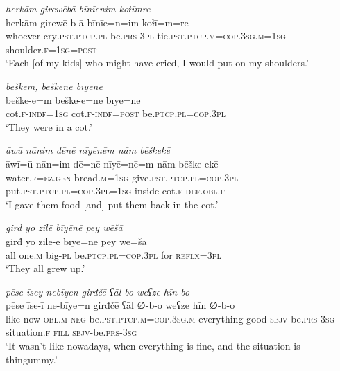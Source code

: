 \ea \label{ŽE.64}
\textit{herkām girewēbā bīnīenim koɫīmre} \\ 
\gll herkām girewē b-ā bīnīe=n=im koɫī=m=re \\ 
 whoever cry\textsc{.pst}\textsc{.ptcp}\textsc{.pl} be\textsc{.prs}\textsc{-3pl} tie\textsc{.pst}\textsc{.ptcp}\textsc{.m}\textsc{=cop}\textsc{.3sg}\textsc{.m}\textsc{=\textsc{1sg}} shoulder\textsc{.f}\textsc{=\textsc{1sg}}\textsc{=\textsc{post}} \\ 
\glt `Each [of my kids] who might have cried, I would put on my shoulders.'
\z 
 
\ea \label{ŽE.65}
\textit{bēškēm, bēškēne bīyēnē} \\ 
\gll bēške-ē=m bēške-ē=ne bīyē=nē \\ 
 cot\textsc{.f}\textsc{-indf}\textsc{=\textsc{1sg}} cot\textsc{.f}\textsc{-indf}\textsc{=\textsc{post}} be\textsc{.ptcp}\textsc{.pl}\textsc{=cop}\textsc{.3pl} \\ 
\glt `They were in a cot.'
\z 
 
\ea \label{ŽE.67}
\textit{āwū nānim dēnē nīyēnēm nām bēškekē} \\ 
\gll āwī=ū nān=im dē=nē nīyē=nē=m nām bēške-ekē \\ 
 water\textsc{.f}\textsc{\textsc{=ez.gen}} bread\textsc{.m}\textsc{=\textsc{1sg}} give\textsc{.pst}\textsc{.ptcp}\textsc{.pl}\textsc{=cop}\textsc{.3pl} put\textsc{.pst}\textsc{.ptcp}\textsc{.pl}\textsc{=cop}\textsc{.3pl}\textsc{=\textsc{1sg}} inside cot\textsc{.f}\textsc{-def}\textsc{.obl}\textsc{.f} \\ 
\glt `I gave them food [and] put them back in the cot.'
\z 
 
\ea \label{ŽE.68}
\textit{girđ yo zilē bīyēnē pey wēšā} \\ 
\gll girđ yo zile-ē bīyē=nē pey wē=šā \\ 
 all one\textsc{.m} big\textsc{\textsc{-pl}} be\textsc{.ptcp}\textsc{.pl}\textsc{=cop}\textsc{.3pl} for \textsc{reflx}\textsc{=3pl} \\ 
\glt `They all grew up.'
\z 
 
\ea \label{ŽE.72}
\textit{pēse īsey nebīyen girđčē ʕāl bo weʕze hīn bo} \\ 
\gll pēse īse-ī ne-bīye=n girđčē ʕāl ∅-b-o weʕze hīn ∅-b-o \\ 
  like now\textsc{-obl}\textsc{.m} \textsc{neg-}be\textsc{.pst}\textsc{.ptcp}\textsc{.m}\textsc{=cop}\textsc{.3sg}\textsc{.m} everything good \textsc{sbjv-}be\textsc{.prs}\textsc{-3sg} situation\textsc{.f} \textsc{fill} \textsc{sbjv-}be\textsc{.prs}\textsc{-3sg} \\ 
\glt `It wasn’t like nowadays, when everything is fine, and the situation is thingummy.'
\z 
 
